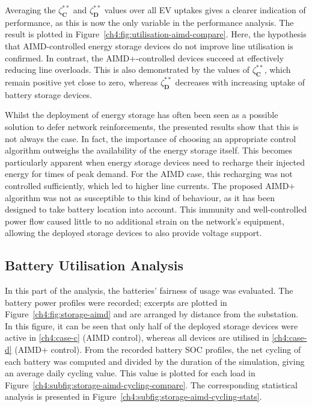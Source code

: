 

Averaging the $\zeta_\textbf{C}^{**}$ and $\zeta_\textbf{D}^{**}$ values over all EV uptakes gives a clearer indication of performance, as this is now the only variable in the performance analysis.
The result is plotted in Figure~\ref{ch4:fig:utilisation-aimd-compare}.
Here, the hypothesis that AIMD-controlled energy storage devices do not improve line utilisation is confirmed.
In contrast, the AIMD+-controlled devices succeed at effectively reducing line overloads. This is also demonstrated by the values of $\zeta_\textbf{C}^{**}$, which remain positive yet close to zero, whereas $\zeta_\textbf{D}^{**}$ decreases with increasing uptake of battery storage devices.

Whilst the deployment of energy storage has often been seen as a possible solution to defer network reinforcements, the presented results show that this is not always the case.
In fact, the importance of choosing an appropriate control algorithm outweighs the availability of the energy storage itself.
This becomes particularly apparent when energy storage devices need to recharge their injected energy for times of peak demand.
For the AIMD case, this recharging was not controlled sufficiently, which led to higher line currents.
The proposed AIMD+ algorithm was not as susceptible to this kind of behaviour, as it has been designed to take battery location into account.
This immunity and well-controlled power flow caused little to no additional strain on the network's equipment, allowing the deployed storage devices to also provide voltage support.

\subsection{Battery Utilisation Analysis}



In this part of the analysis, the batteries' fairness of usage was evaluated. The battery power profiles were recorded; excerpts are plotted in Figure~\ref{ch4:fig:storage-aimd} and are arranged by distance from the substation.
In this figure, it can be seen that only half of the deployed storage devices were active in \ref{ch4:case-c} (AIMD control), whereas all devices are utilised in \ref{ch4:case-d} (AIMD+ control).
From the recorded battery SOC profiles, the net cycling of each battery was computed and divided by the duration of the simulation, giving an average daily cycling value.
This value is plotted for each load in Figure~\ref{ch4:subfig:storage-aimd-cycling-compare}. The corresponding statistical analysis is presented in Figure~\ref{ch4:subfig:storage-aimd-cycling-stats}.

